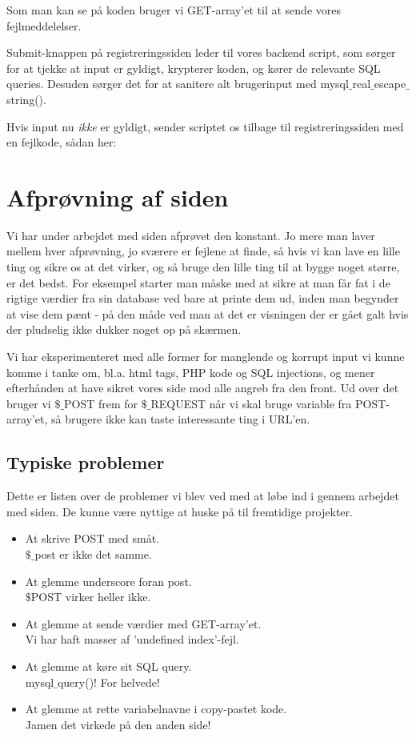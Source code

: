 \documentclass{article}
\begin{document}


Som man kan se på koden bruger vi GET-array'et til at sende vores fejlmeddelelser.

Submit-knappen på registreringssiden leder til vores backend script, som sørger for at tjekke at input er gyldigt, krypterer koden, og kører de relevante SQL queries. Desuden sørger det for at sanitere alt brugerinput med mysql$\_$real$\_$escape$\_$string(). 

Hvis input nu \emph{ikke} er gyldigt, sender scriptet os tilbage til registreringssiden med en fejlkode, sådan her:



\section{Afprøvning af siden}
Vi har under arbejdet med siden afprøvet den konstant. Jo mere man laver mellem hver afprøvning, jo sværere er fejlene at finde, så hvis vi kan lave en lille ting og sikre os at det virker, og så bruge den lille ting til at bygge noget større, er det bedst. For eksempel starter man måske med at sikre at man får fat i de rigtige værdier fra sin database ved bare at printe dem ud, inden man begynder at vise dem pænt - på den måde ved man at det er visningen der er gået galt hvis der pludselig ikke dukker noget op på skærmen.

Vi har eksperimenteret med alle former for manglende og korrupt input vi kunne komme i tanke om, bl.a. html tags, PHP kode og SQL injections, og mener efterhånden at have sikret vores side mod alle angreb fra den front. Ud over det bruger vi $\$$$\_$POST frem for $\$$$\_$REQUEST når vi skal bruge variable fra POST-array'et, så brugere ikke kan taste interessante ting i URL'en.

\subsection{Typiske problemer}
Dette er listen over de problemer vi blev ved med at løbe ind i gennem arbejdet med siden. De kunne være nyttige at huske på til fremtidige projekter.

\begin{itemize}
	\item At skrive POST med småt. \\
		$\$$$\_$post er ikke det samme.
	\item At glemme underscore foran post. \\
		$\$$POST virker heller ikke.
	\item At glemme at sende værdier med GET-array'et. \\
		Vi har haft masser af 'undefined index'-fejl.
	\item At glemme at køre sit SQL query. \\
		mysql$\_$query()! For helvede!
	\item At glemme at rette variabelnavne i copy-pastet kode. \\
		Jamen det virkede på den anden side!
\end{itemize}
\end{document}

